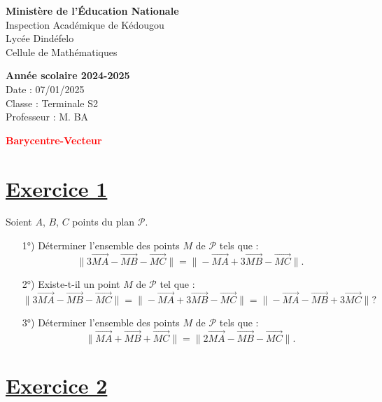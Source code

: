 \documentclass[12pt]{article}
\begin{document}
\noindent
\begin{minipage}[t]{0.48\textwidth}
\raggedright
\textbf{Ministère de l'Éducation Nationale}\\
Inspection Académique de Kédougou\\
Lycée Dindéfelo\\
Cellule de Mathématiques
\end{minipage}
\hfill
\begin{minipage}[t]{0.48\textwidth}
\raggedleft
\textbf{Année scolaire 2024-2025}\\
Date : 07/01/2025\\
Classe : Terminale S2\\
Professeur : M. BA
\end{minipage}
\vspace{1cm}
\begin{center}
\textbf{\textcolor{red}{Barycentre-Vecteur}}
\end{center}
\vspace{1cm}

\section*{\underline{Exercice 1}}

Soient \( A \), \( B \), \( C \) points du plan \( \mathcal{P} \).

\begin{enumerate}
    \item[1°)] Déterminer l'ensemble des points \( M \) de \( \mathcal{P} \) tels que :
    \[
    \| 3 \overrightarrow{MA} - \overrightarrow{MB} - \overrightarrow{MC} \| = \| - \overrightarrow{MA} + 3 \overrightarrow{MB} - \overrightarrow{MC} \|.
    \]
    
    \item[2°)] Existe-t-il un point \( M \) de \( \mathcal{P} \) tel que :
    \[
    \| 3 \overrightarrow{MA} - \overrightarrow{MB} - \overrightarrow{MC} \| = \| - \overrightarrow{MA} + 3 \overrightarrow{MB} - \overrightarrow{MC} \| = \| - \overrightarrow{MA} - \overrightarrow{MB} + 3 \overrightarrow{MC} \| ?
    \]

    \item[3°)] Déterminer l'ensemble des points \( M \) de \( \mathcal{P} \) tels que :
    \[
    \| \overrightarrow{MA} + \overrightarrow{MB} + \overrightarrow{MC} \| =  \| 2\overrightarrow{MA} - \overrightarrow{MB} - \overrightarrow{MC} \|.
    \]
\end{enumerate}

\section*{\underline{Exercice 2}}
\end{document}
